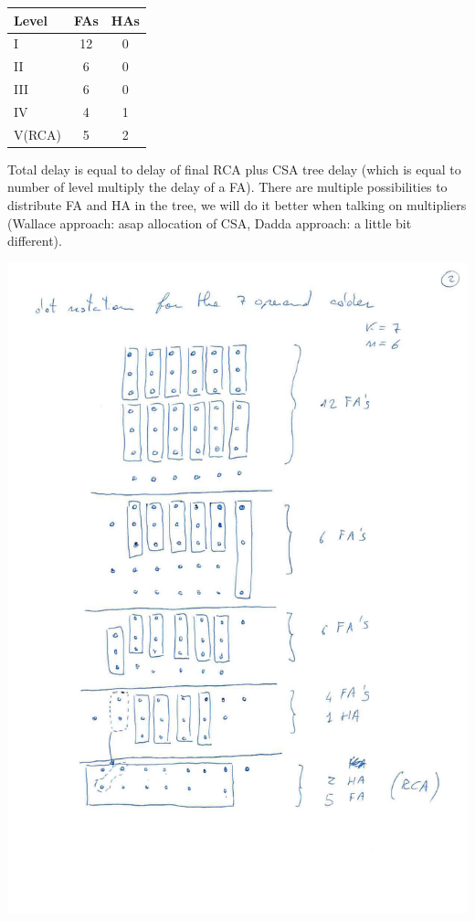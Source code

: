 \begin{center}
  \begin{tabular}{|l|c|c|}
    \hline
    Level&  FAs&  HAs\\
    \hline
    I&    12&   0\\
    II&   6&    0\\
    III&  6&    0\\
    IV&   4&    1\\
    V(RCA)& 5&    2\\
    \hline
  \end{tabular}
\end{center}

Total delay is equal to delay of final RCA plus CSA tree delay (which is equal to number of level multiply the delay of a FA). There are multiple possibilities to distribute FA and HA in the tree, we will do it better when talking on multipliers (Wallace approach: asap allocation of CSA, Dadda approach: a little bit different).

\begin{center}
  \includegraphics[width=1.0\linewidth]{img/img2/31}
\end{center}

